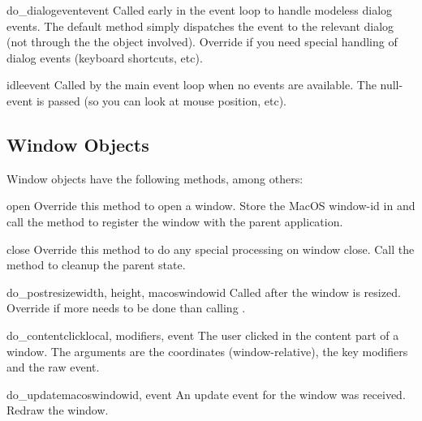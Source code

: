 \begin{methoddesc}[Application]{do_dialogevent}{event}
Called early in the event loop to handle modeless dialog events. The
default method simply dispatches the event to the relevant dialog (not
through the the  object involved). Override if you
need special handling of dialog events (keyboard shortcuts, etc).
\end{methoddesc}

\begin{methoddesc}[Application]{idle}{event}
Called by the main event loop when no events are available. The
null-event is passed (so you can look at mouse position, etc).
\end{methoddesc}


\subsection{Window Objects \label{window-objects}}

Window objects have the following methods, among others:


\begin{methoddesc}[Window]{open}{}
Override this method to open a window. Store the MacOS window-id in
 and call the  method to
register the window with the parent application.
\end{methoddesc}

\begin{methoddesc}[Window]{close}{}
Override this method to do any special processing on window
close. Call the  method to cleanup the parent
state.
\end{methoddesc}

\begin{methoddesc}[Window]{do_postresize}{width, height, macoswindowid}
Called after the window is resized. Override if more needs to be done
than calling .
\end{methoddesc}

\begin{methoddesc}[Window]{do_contentclick}{local, modifiers, event}
The user clicked in the content part of a window. The arguments are
the coordinates (window-relative), the key modifiers and the raw
event.
\end{methoddesc}

\begin{methoddesc}[Window]{do_update}{macoswindowid, event}
An update event for the window was received. Redraw the window.
\end{methoddesc}

